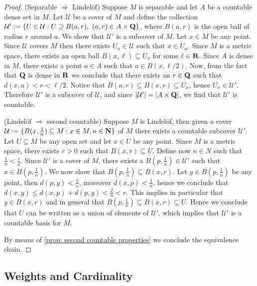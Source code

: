 \begin{proof}
  (Separable \(\Rightarrow\) Lindelöf) Suppose \(M\) is separable and let \(A\)
  be a countable dense set in \(M\). Let \(\mathcal U\) be a cover of \(M\) and
  define the collection \(\mathcal U' := \{U \in \mathcal U : U \supseteq B(a,
  r),\ (a, r) \in A \times \mathbf{Q}\}\), where \(B(a,r)\) is the open ball of
  radius \(r\) around \(a\). We show that \(\mathcal U'\) is a subcover of
  \(M\).
  Let \(x \in M\) be any point. Since \(\mathcal U\) covers \(M\) then there
  exists \(U_x \in \mathcal U\) such that \(x \in U_x\). Since \(M\) is a metric
  space, there exists an open ball \(B(x, \ell) \subseteq U_x\) for some \(\ell
  \in \mathbf{R}\).
  Since \(A\) is dense in \(M\), there exists a point \(a \in A\) such that \(a
  \in B(x, \ell/2)\). Now, from the fact that \(\mathbf{Q}\) is dense in
  \(\mathbf{R}\) we conclude that there exists an \(r \in \mathbf{Q}\) such that
  \(d(x, a) < r < \ell/2\). Notice that \(B(a, r) \subseteq B(x, r) \subseteq
  U_x\), hence \(U_x \in \mathcal U'\). Therefore \(\mathcal U'\) is a subcover
  of \(\mathcal U\), and since \(|\mathcal U'| = |A \times \mathbf{Q}|\), we
  find that \(\mathcal U'\) is countable.

  (Lindelöf \(\Rightarrow\) second countable) Suppose \(M\) is Lindelöf, then
  given a cover \(\mathcal U := \{B(x, \frac{1}{n}) \subseteq M : x \in M, n \in
  \mathbf{N}\}\) of \(M\) there exists a countable subcover \(\mathcal U'\). Let
  \(U \subseteq M\) be any open set and let \(x \in U\) be any point. Since
  \(M\) is a metric space, there exists \(r > 0\) such that \(B(x, r) \subseteq
  U\). Define now \(n \in N\) such that \(\frac 1 n < \frac r 2\). Since
  \(\mathcal U'\) is a cover of \(M\), there exists a \(B(p, \frac 1 n) \in
  \mathcal U'\) such that \(x \in B(p, \frac 1 n)\). We now show that \(B(p,
  \frac 1 n) \subseteq B(x, r)\). Let \(y \in B(p, \frac 1 n)\) be any point,
  then \(d(p, y) < \frac 1 n\), moreover \(d(x, p) < \frac 1 n\), hence we
  conclude that \(d(x, y) \leq d(x, p) + d(p, y) < \frac 2 n < r\). This implies
  in particular that \(y \in B(x, r)\) and in general that \(B(p, \frac 1 n)
  \subseteq B(x, r) \subseteq U\). Hence we conclude that \(U\) can be written
  as a union of elements of \(\mathcal U'\), which implies that \(\mathcal U'\)
  is a countable basis for \(M\).

  By means of \cref{prop: second countable properties} we conclude the
  equivalence chain.
\end{proof}

\subsection{Weights and Cardinality}

